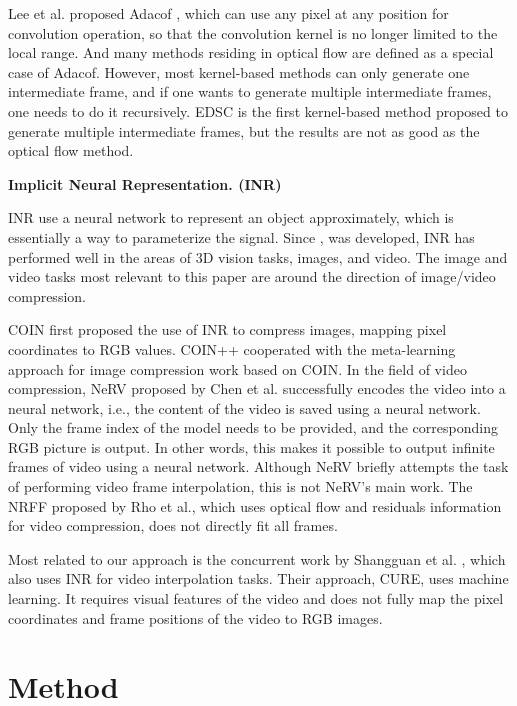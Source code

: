 \documentclass{article}
\begin{document}
Lee et al. proposed Adacof \cite{lee2020adacof}, which can use any pixel at any position for convolution operation,
so that the convolution kernel is no longer limited to the local range.
And many methods residing in optical flow are defined as a special case of Adacof.
However, most kernel-based methods can only generate one intermediate frame, and if one wants to generate multiple intermediate frames, one needs to do it recursively.
EDSC \cite{cheng2021multiple} is the first kernel-based method proposed to generate multiple intermediate frames, but the results are not as good as the optical flow method.


\textbf{ Implicit Neural Representation. (INR)}

INR use a neural network to represent an object approximately, which is essentially a way to parameterize the signal.
Since \cite{mildenhall2020nerf}, \cite{sitzmann2020implicit} was developed, INR has performed well in the areas of 3D vision tasks, images, and video.
The image and video tasks most relevant to this paper are around the direction of image/video compression.

COIN \cite{dupont2021coin} first proposed the use of INR to compress images, mapping pixel coordinates to RGB values.
COIN++ \cite{dupont2022coin++} cooperated with the meta-learning approach for image compression work based on COIN.
In the field of video compression, NeRV \cite{chen2021nerv} proposed by Chen et al. successfully encodes the video into a neural network, i.e., the content of the video is saved using a neural network.
Only the frame index of the model needs to be provided, and the corresponding RGB picture is output.
In other words, this makes it possible to output infinite frames of video using a neural network.
Although NeRV briefly attempts the task of performing video frame interpolation, this is not NeRV's main work.
The NRFF \cite{rho2022neural} proposed by Rho et al., which uses optical flow and residuals information for video compression, does not directly fit all frames.

Most related to our approach is the concurrent work by Shangguan et al. \cite{shangguan2022learning}, which also uses INR for video interpolation tasks.
Their approach, CURE, uses machine learning.
It requires visual features of the video and does not fully map the pixel coordinates and frame positions of the video to RGB images.


\section{Method}
\end{document}
